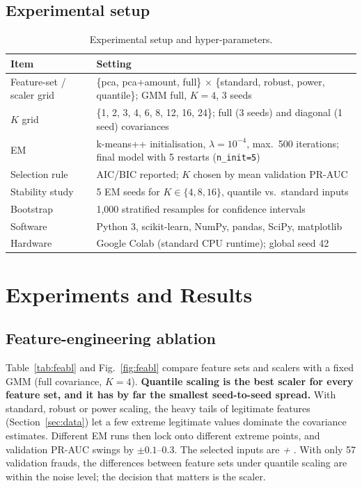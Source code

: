 \documentclass[12pt]{article}
\begin{document}
\subsection{Experimental setup}
\begin{table}[H]
\centering\small
\caption{Experimental setup and hyper-parameters.}
\label{tab:setup}
\begin{tabularx}{\linewidth}{@{}l X@{}}
\toprule
\textbf{Item} & \textbf{Setting}\\
\midrule
Feature-set / scaler grid & \{pca, pca+amount, full\} $\times$ \{standard, robust, power, quantile\}; GMM full, $K=4$, 3 seeds\\
$K$ grid & \{1, 2, 3, 4, 6, 8, 12, 16, 24\}; full (3 seeds) and diagonal (1 seed) covariances\\
EM & k-means++ initialisation, $\lambda=10^{-4}$, max.\ 500 iterations; final model with 5 restarts (\texttt{n\_init=5})\\
Selection rule & AIC/BIC reported; $K$ chosen by mean validation PR-AUC\\
Stability study & 5 EM seeds for $K\in\{4,8,16\}$, quantile vs.\ standard inputs\\
Bootstrap & 1{,}000 stratified resamples for confidence intervals\\
Software & Python 3, scikit-learn, NumPy, pandas, SciPy, matplotlib~\cite{pedregosa2011}\\
Hardware & Google Colab (standard CPU runtime); global seed 42\\
\bottomrule
\end{tabularx}
\end{table}

\section{Experiments and Results}\label{sec:results}

\subsection{Feature-engineering ablation}
Table~\ref{tab:feabl} and Fig.~\ref{fig:feabl} compare feature sets and scalers with a fixed GMM (full covariance,
$K=4$). \textbf{Quantile scaling is the best scaler for every feature set, and it has by far the smallest seed-to-seed
spread.} With standard, robust or power scaling, the heavy tails of legitimate features (Section~\ref{sec:data}) let a
few extreme legitimate values dominate the covariance estimates. Different EM runs then lock onto different extreme
points, and validation PR-AUC swings by $\pm0.1$--$0.3$. The selected inputs are \emph{\selFS{} + \selScaler{}}. With
only 57 validation frauds, the differences between feature sets under quantile scaling are within the noise level;
the decision that matters is the scaler.
\end{document}
